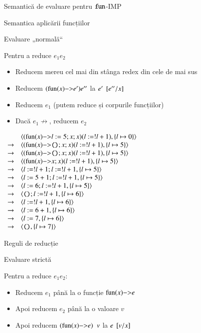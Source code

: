 \documentclass[xcolor=pdftex,romanian,colorlinks]{beamer}
\begin{document}
\begin{section}{Semantică de evaluare pentru $\mathrel{\text{\ttfamily fun}}$-IMP}
\begin{subsection}{Semantica aplicării funcțiilor}
\begin{frame}{Evaluare „normală“}
\begin{block}{}
Pentru a reduce $e_1 \mathrel{} e_2$
\begin{itemize}
\item Reducem mereu cel mai din stânga redex din cele de mai sus
\item Reducem $(\fun{x}{e'}) e''$ la $e'\mathbin{}[e''/x]$
\item Reducem $e_1$ (putem reduce și corpurile funcțiilor)
\item Dacă $e_1\not\rightarrow$, reducem $e_2$
\end{itemize} 
\end{block}

\hfill {\small$\begin{array}{ll}
& \c{(\fun{x}{l := 5 ; x ; x}) (l := !l + 1), \{l \mapsto 0\}} \\
\rightarrow& \c{(\fun{x}{\Sskip ; x ; x}) (l := !l + 1), \{l \mapsto 5\}} \\
\rightarrow& \c{(\fun{x}{\Sskip ; x ; x}) (l := !l + 1), \{l \mapsto 5\}} \\
\rightarrow& \c{(\fun{x}{x ; x}) (l := !l + 1), \{l \mapsto 5\}} \\
\rightarrow& \c{l := !l + 1 ; l := !l + 1, \{l \mapsto 5\}} \\
\rightarrow& \c{l := 5 + 1 ; l := !l + 1, \{l \mapsto 5\}} \\
\rightarrow& \c{l := 6 ; l := !l + 1, \{l \mapsto 5\}} \\
\rightarrow& \c{\Sskip ; l := !l + 1, \{l \mapsto 6\}} \\
\rightarrow& \c{l := !l + 1, \{l \mapsto 6\}} \\
\rightarrow& \c{l := 6 + 1, \{l \mapsto 6\}} \\
\rightarrow& \c{l := 7, \{l \mapsto 6\}} \\
\rightarrow& \c{\Sskip, \{l \mapsto 7\}}
\end{array}$} \hfill\;
\end{frame}


\end{subsection}

\begin{subsection}{Reguli de reducție}


\begin{frame}{Evaluare strictă}
\begin{block}{}
Pentru a reduce $e_1 \mathrel{} e_2$:
\begin{itemize}
\item  Reducem $e_1$ până la o funcție
$\fun{x}{e}$
\item Apoi reducem $e_2$ până la o valoare $v$
\item Apoi reducem $(\fun{x}{e})\mathrel{}v$ la $e\mathbin{}[v/x]$
\end{itemize}
\end{block}


\end{frame}
\end{subsection}
\end{section}
\end{document}
